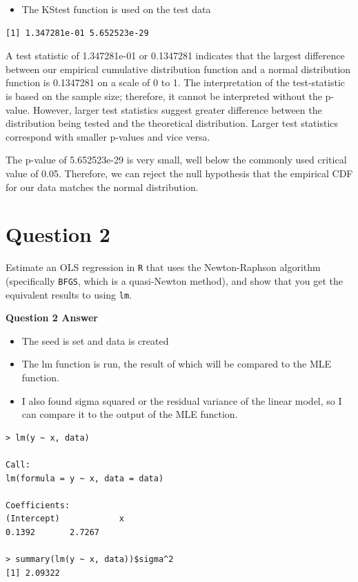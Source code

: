 \documentclass[12pt,letterpaper]{article}
\begin{document}
 
\begin{itemize}
\item The KS\textunderscore test function is used on the test data
\end{itemize}
 

\begin{verbatim}
[1] 1.347281e-01 5.652523e-29
\end{verbatim}
\noindent A test statistic of 1.347281e-01 or 0.1347281 indicates that the largest difference between our empirical cumulative distribution function and a normal distribution function is 0.1347281 on a scale of 0 to 1. The interpretation of the test-statistic is based on the sample size; therefore, it cannot be interpreted without the p-value. However, larger test statistics suggest greater difference between the distribution being tested and the theoretical distribution. Larger test statistics correspond with smaller p-values and vice versa.

\vspace{.5cm}

\noindent The p-value of 5.652523e-29 is very small, well below the commonly used critical value of 0.05. Therefore, we can reject the null hypothesis that the empirical CDF for our data matches the normal distribution.

\newpage
\section*{Question 2}
\noindent Estimate an OLS regression in \texttt{R} that uses the Newton-Raphson algorithm (specifically \texttt{BFGS}, which is a quasi-Newton method), and show that you get the equivalent results to using \texttt{lm}. 
\vspace{.5cm}

\noindent \textbf{Question 2 Answer}
\begin{itemize}
\item The seed is set and data is created
\end{itemize}
 

\begin{itemize}
	\item The lm function is run, the result of which will be compared to the MLE function.
	\item I also found sigma squared or the residual variance of the linear model, so I can compare it to the output of the MLE function.
\end{itemize}
 
\begin{verbatim}
> lm(y ~ x, data)

Call:
lm(formula = y ~ x, data = data)

Coefficients:
(Intercept)            x  
0.1392       2.7267  

> summary(lm(y ~ x, data))$sigma^2
[1] 2.09322
\end{verbatim}
\end{document}
